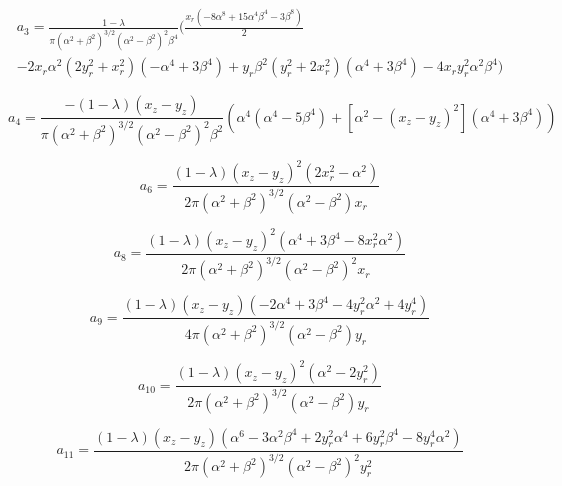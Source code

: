 \documentclass[12pt]{article}
\begin{document}
\begin{align}
\label{equ:coeff_a3}
a_{3} = \frac{1 - \lambda}{\pi (\alpha^{2} + \beta^{2})^{3/2} (\alpha^{2} - \beta^{2})^{2} \beta^{4}} \bigg( \frac{x_{r} (-8 \alpha^{8} + 15 \alpha^{4} \beta^{4} - 3 \beta^{8})}{2} \nonumber \\
- 2 x_{r} \alpha^{2} (2 y_{r}^{2} + x_{r}^{2}) (-\alpha^{4} + 3 \beta^{4}) + y_{r} \beta^{2} (y_{r}^{2} + 2 x_{r}^{2}) (\alpha^{4} + 3 \beta^{4}) - 4 x_{r} y_{r}^{2} \alpha^{2} \beta^{4} \bigg)
\end{align}

\begin{equation}
\label{equ:coeff_a4}
a_{4} = \frac{-(1 - \lambda) (x_{z} - y_{z})}{\pi (\alpha^{2} + \beta^{2})^{3/2} (\alpha^{2} - \beta^{2})^{2} \beta^{2}} \left(\alpha^{4} (\alpha^{4} - 5 \beta^{4}) + [\alpha^{2}- (x_{z} - y_{z})^{2}] (\alpha^{4} + 3 \beta^{4}) \right)
\end{equation}

\begin{equation}
\label{equ:coeff_a6}
a_{6} = \frac{(1 - \lambda) (x_{z} - y_{z})^{2} (2 x_{r}^{2} - \alpha^{2})}{2 \pi (\alpha^{2} + \beta^{2})^{3/2} (\alpha^{2} - \beta^{2}) x_{r}}
\end{equation}

\begin{equation}
\label{equ:coeff_a8}
a_{8} = \frac{(1 - \lambda) (x_{z} - y_{z})^{2} (\alpha^{4} + 3 \beta^{4} - 8 x_{r}^{2} \alpha^{2})}{2 \pi (\alpha^{2} + \beta^{2})^{3/2} (\alpha^{2} - \beta^{2})^{2} x_{r}}
\end{equation}

\begin{equation}
\label{equ:coeff_a9}
a_{9} = \frac{(1 - \lambda) (x_{z} - y_{z}) (-2 \alpha^{4} + 3 \beta^{4} - 4 y_{r}^{2} \alpha^{2} + 4 y_{r}^{4})}{4 \pi (\alpha^{2} + \beta^{2})^{3/2} (\alpha^{2} - \beta^{2}) y_{r}}
\end{equation}

\begin{equation}
\label{equ:coeff_a10}
a_{10} = \frac{(1 - \lambda) (x_{z} - y_{z})^{2} (\alpha^{2} - 2 y_{r}^{2})}{2 \pi (\alpha^{2} + \beta^{2})^{3/2} (\alpha^{2} - \beta^{2}) y_{r}}
\end{equation}

\begin{equation}
\label{equ:coeff_a11}
a_{11} = \frac{(1 - \lambda) (x_{z} - y_{z}) (\alpha^{6} - 3 \alpha^{2} \beta^{4} + 2 y_{r}^{2} \alpha^{4} + 6 y_{r}^{2} \beta^{4} - 8 y_{r}^{4} \alpha^{2})}{2 \pi (\alpha^{2} + \beta^{2})^{3/2} (\alpha^{2} - \beta^{2})^{2} y_{r}^{2}}
\end{equation}
\end{document}
